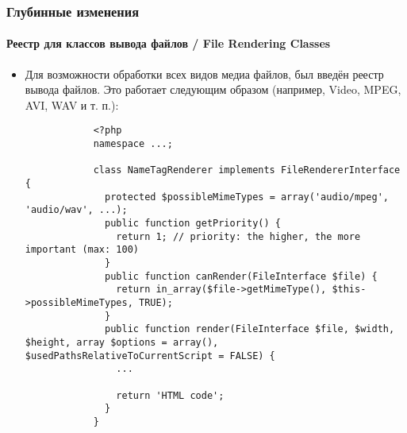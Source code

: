 
\begin{frame}[fragile]
	\frametitle{Глубинные изменения}
	\framesubtitle{Реестр для классов вывода файлов / File Rendering Classes}

	\lstset{
		basicstyle=\tiny\ttfamily
	}

	\begin{itemize}
		\item Для возможности обработки всех видов медиа файлов, был введён реестр вывода файлов.\newline
			Это работает следующим образом (например, Video, MPEG, AVI, WAV и т. п.):

		\begin{lstlisting}
			<?php
			namespace ...;

			class NameTagRenderer implements FileRendererInterface {
			  protected $possibleMimeTypes = array('audio/mpeg', 'audio/wav', ...);
			  public function getPriority() {
			    return 1; // priority: the higher, the more important (max: 100)
			  }
			  public function canRender(FileInterface $file) {
			    return in_array($file->getMimeType(), $this->possibleMimeTypes, TRUE);
			  }
			  public function render(FileInterface $file, $width, $height, array $options = array(), $usedPathsRelativeToCurrentScript = FALSE) {
			    ...

			    return 'HTML code';
			  }
			}
		\end{lstlisting}

	\end{itemize}

\end{frame}


